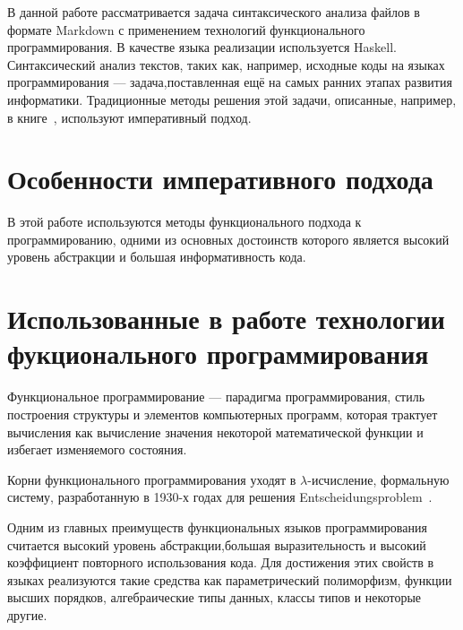 



\newcommand\todo[1]{\textcolor{red}{#1}} 

\newcommand\sep{\rule{4cm}{0.4pt}}



\Intro
В данной работе рассматривается задача синтаксического анализа
файлов в формате Markdown с применением технологий функционального
программирования. В качестве языка реализации используется Haskell.
Синтаксический анализ текстов, таких как, например, исходные коды на языках программирования --- задача,поставленная ещё на самых ранних этапах развития информатики. Традиционные методы решения этой задачи, описанные, например, в книге~\autocite{DragonBook2}, используют императивный подход. 

\section{Особенности императивного подхода}

В этой работе используются методы функционального подхода к программированию, одними из основных достоинств которого является высокий уровень абстракции и большая информативность кода.

\section{Использованные в работе технологии фукционального программирования}

Функциональное программирование --- парадигма программирования, стиль построения структуры и элементов компьютерных программ, которая трактует вычисления как вычисление значения некоторой математической функции и избегает изменяемого состояния.

Корни функционального программирования уходят в $\lambda$-исчисление, формальную систему, разработанную в 1930-х годах для решения Entscheidungsproblem~\autocite{Entscheidungsproblem}.

Одним из главных преимуществ функциональных языков программирования считается высокий уровень абстракции,большая выразительность и высокий коэффициент повторного использования кода. Для достижения этих свойств в языках реализуются такие средства как параметрический полиморфизм, функции высших порядков, алгебраические типы данных, классы типов и некоторые другие.

